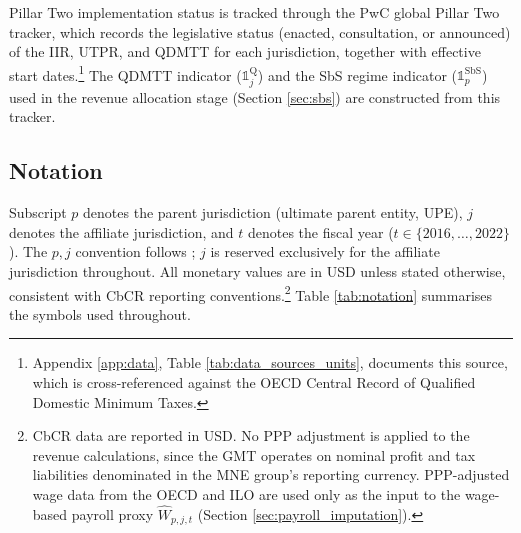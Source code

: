 \documentclass[11pt,a4paper]{article}
\begin{document}
Pillar Two implementation status is tracked through the PwC global Pillar Two tracker, which records the legislative status (enacted, consultation, or announced) of the IIR, UTPR, and QDMTT for each jurisdiction, together with effective start dates.\footnote{Appendix \ref{app:data}, Table \ref{tab:data_sources_units}, documents this source, which is cross-referenced against the OECD Central Record of Qualified Domestic Minimum Taxes.} The QDMTT indicator ($\mathbb{1}_j^{\text{Q}}$) and the SbS regime indicator ($\mathbb{1}_p^{\text{SbS}}$) used in the revenue allocation stage (Section \ref{sec:sbs}) are constructed from this tracker.

\subsection{Notation}\label{sec:notation}

Subscript $p$ denotes the parent jurisdiction (ultimate parent entity, UPE), $j$ denotes the affiliate jurisdiction, and $t$ denotes the fiscal year ($t \in \{2016, \ldots, 2022\}$). The $p,j$ convention follows \citet{barake2022}; $j$ is reserved exclusively for the affiliate jurisdiction throughout. All monetary values are in USD unless stated otherwise, consistent with CbCR reporting conventions.\footnote{CbCR data are reported in USD. No PPP adjustment is applied to the revenue calculations, since the GMT operates on nominal profit and tax liabilities denominated in the MNE group's reporting currency. PPP-adjusted wage data from the OECD and ILO are used only as the input to the wage-based payroll proxy $\hat{W}_{p,j,t}$ (Section \ref{sec:payroll_imputation}).} Table \ref{tab:notation} summarises the symbols used throughout.
\end{document}
